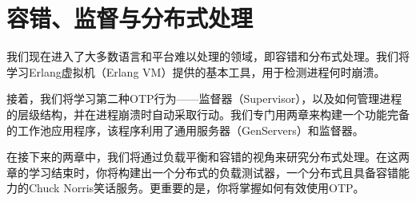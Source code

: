 \part{容错、监督与分布式处理}\label{part2}

我们现在进入了大多数语言和平台难以处理的领域，即容错和分布式处理。我们将学习Erlang虚拟机（Erlang VM）提供的基本工具，用于检测进程何时崩溃。

接着，我们将学习第二种OTP行为------监督器（Supervisor），以及如何管理进程的层级结构，并在进程崩溃时自动采取行动。我们专门用两章来构建一个功能完备的工作池应用程序，该程序利用了通用服务器（GenServers）和监督器。

在接下来的两章中，我们将通过负载平衡和容错的视角来研究分布式处理。在这两章的学习结束时，你将构建出一个分布式的负载测试器，一个分布式且具备容错能力的Chuck Norris笑话服务。更重要的是，你将掌握如何有效使用OTP。
